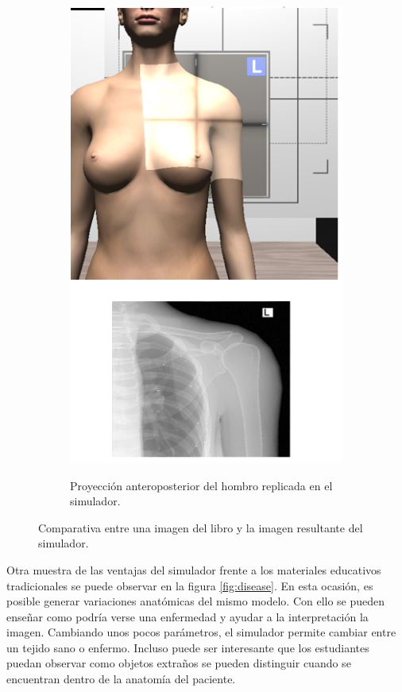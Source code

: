 \begin{figure}[h]
\begin{subfigure}[b]{0.45\linewidth}
        {\includegraphics[width=\linewidth]{IMG/XRayshoulder3.png}}
        \caption{Proyección anteroposterior del hombro replicada en el simulador.}
    \end{subfigure}
    \caption{\label{fig:xraycomp} Comparativa entre una imagen del libro\cite{carver2012medical} y la imagen resultante del simulador.}
   \end{figure}

Otra muestra de las ventajas del simulador frente a los materiales educativos tradicionales se puede observar en la figura \ref{fig:disease}. En esta ocasión, es posible generar variaciones anatómicas del mismo modelo. Con ello se pueden enseñar como podría verse una enfermedad y ayudar a la interpretación la imagen. Cambiando unos pocos parámetros, el simulador permite cambiar entre un tejido sano o enfermo. Incluso puede ser interesante que los estudiantes puedan observar como objetos extraños se pueden distinguir cuando se encuentran dentro de la anatomía del paciente. 

